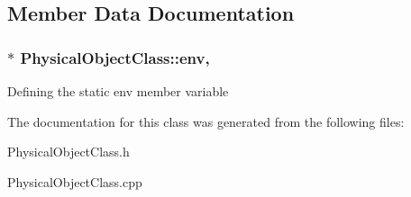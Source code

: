 \subsection{Member Data Documentation}
\hypertarget{classBaseObject_af064f06ff268b46d162c9aadf4604570}{
\subsubsection[{env}]{ $\ast$ Physical\-Object\-Class\-::env\hspace{0.3cm}{\ttfamily [static]}, {\ttfamily [protected]}}}\label{classBaseObject_af064f06ff268b46d162c9aadf4604570}
Defining the static env member variable 

The documentation for this class was generated from the following files\-:\begin{DoxyCompactItemize}
\item 
Physical\-Object\-Class.\-h\item 
Physical\-Object\-Class.\-cpp\end{DoxyCompactItemize}
